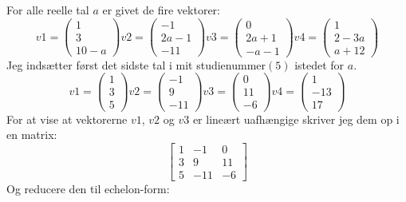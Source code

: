 For alle reelle tal $a$ er givet de fire vektorer:
\begin{equation*}
v1 = \left(
\begin{array}{c}
1\\
3\\
10 - a
\end{array}
\right)
v2 = \left(
\begin{array}{c}
-1\\
2a - 1\\
-11
\end{array}
\right)
v3 = \left(
\begin{array}{c}
0\\
2a + 1\\
-a-1
\end{array}
\right)
v4 = \left(
\begin{array}{c}
1\\
2-3a\\
a+12
\end{array}
\right)
\end{equation*}
Jeg indsætter først det sidste tal i mit studienummer$(5)$ istedet for $a$.
\begin{equation*}
v1 = \left(
\begin{array}{c}
1\\
3\\
5
\end{array}
\right)
v2 = \left(
\begin{array}{c}
-1\\
9\\
-11
\end{array}
\right)
v3 = \left(
\begin{array}{c}
0\\
11\\
-6
\end{array}
\right)
v4 = \left(
\begin{array}{c}
1\\
-13\\
17
\end{array}
\right)
\end{equation*}
For at vise at vektorerne $v1$, $v2$ og $v3$ er lineært uafhængige skriver jeg
dem op i en matrix:
\begin{equation*}
\begin{bmatrix}
1 & -1 & 0\\
3 & 9 & 11\\
5 & -11 & -6
\end{bmatrix}
\end{equation*}
Og reducere den til echelon-form:\\
